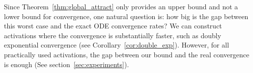 \documentclass[twoside]{article}
\newcommand{\E}{\mathbb{E}\,}
\newcommand{\he}{\mathrm{he}}
\theoremstyle{definition}
\newcommand{\thomas}[1]{{\color{blue}\textit{#1}}}
\begin{document}
Since Theorem~\ref{thm:global_attract} only provides an upper bound and not a lower bound for convergence, one natural question is: how big is the gap between this worst case and the exact ODE convergence rates? We can construct activations where the convergence is substantially faster, such as doubly exponential convergence (see Corollary~\ref{cor:double_exp}). However, for all practically used activations, the gap between our bound and the real convergence is enough (See section~\ref{sec:experiments}).




% 



 
\end{document}
